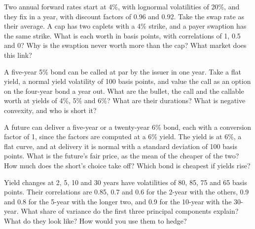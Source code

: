 \begin{question}\label{iq:iv2:rates-and-fx:37}
Two annual forward rates start at 4\%, with lognormal volatilities of 20\%, and they fix in a year, with discount factors of 0.96 and 0.92. Take the swap rate as their average. A cap has two caplets with a 4\% strike, and a payer swaption has the same strike. What is each worth in basis points, with correlations of 1, 0.5 and 0? Why is the swaption never worth more than the cap? What market does this link?
\end{question}

\begin{question}\label{iq:iv2:rates-and-fx:38}
A five-year 5\% bond can be called at par by the issuer in one year. Take a flat yield, a normal yield volatility of 100 basis points, and value the call as an option on the four-year bond a year out. What are the bullet, the call and the callable worth at yields of 4\%, 5\% and 6\%? What are their durations? What is negative convexity, and who is short it?
\end{question}

\begin{question}\label{iq:iv2:rates-and-fx:39}
A future can deliver a five-year or a twenty-year 6\% bond, each with a conversion factor of 1, since the factors are computed at a 6\% yield. The yield is at 6\%, a flat curve, and at delivery it is normal with a standard deviation of 100 basis points. What is the future's fair price, as the mean of the cheaper of the two? How much does the short's choice take off? Which bond is cheapest if yields rise?
\end{question}

\begin{question}\label{iq:iv2:rates-and-fx:40}
Yield changes at 2, 5, 10 and 30 years have volatilities of 80, 85, 75 and 65 basis points. Their correlations are 0.85, 0.7 and 0.6 for the 2-year with the others, 0.9 and 0.8 for the 5-year with the longer two, and 0.9 for the 10-year with the 30-year. What share of variance do the first three principal components explain? What do they look like? How would you use them to hedge?
\end{question}

